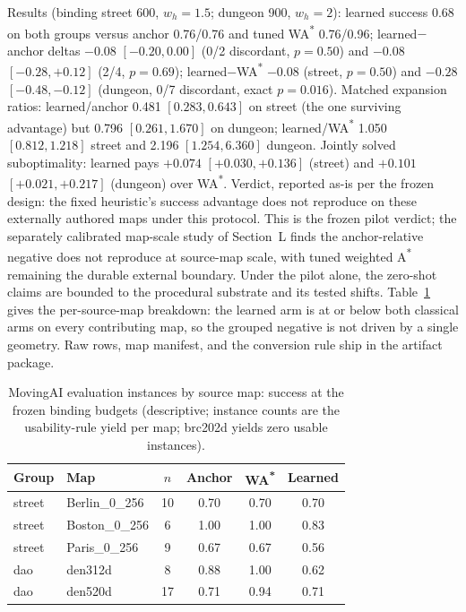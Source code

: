 \documentclass[letterpaper]{article} %
\begin{document}
Results (binding street 600, $w_h{=}1.5$; dungeon 900, $w_h{=}2$): learned success 0.68 on both groups versus anchor 0.76/0.76 and tuned WA\textsuperscript{*} 0.76/0.96; learned$-$anchor deltas $-0.08$ $[-0.20, 0.00]$ (0/2 discordant, $p{=}0.50$) and $-0.08$ $[-0.28, +0.12]$ (2/4, $p{=}0.69$); learned$-$WA\textsuperscript{*} $-0.08$ (street, $p{=}0.50$) and $-0.28$ $[-0.48,-0.12]$ (dungeon, 0/7 discordant, exact $p{=}0.016$). Matched expansion ratios: learned/anchor 0.481 $[0.283, 0.643]$ on street (the one surviving advantage) but 0.796 $[0.261, 1.670]$ on dungeon; learned/WA\textsuperscript{*} 1.050 $[0.812, 1.218]$ street and 2.196 $[1.254, 6.360]$ dungeon. Jointly solved suboptimality: learned pays $+0.074$ $[+0.030, +0.136]$ (street) and $+0.101$ $[+0.021, +0.217]$ (dungeon) over WA\textsuperscript{*}. Verdict, reported as-is per the frozen design: the fixed heuristic's success advantage does not reproduce on these externally authored maps under this protocol. This is the frozen pilot verdict; the separately calibrated map-scale study of Section~L finds the anchor-relative negative does not reproduce at source-map scale, with tuned weighted A\textsuperscript{*} remaining the durable external boundary. Under the pilot alone, the zero-shot claims are bounded to the procedural substrate and its tested shifts. Table~\ref{tab:maimaps} gives the per-source-map breakdown: the learned arm is at or below both classical arms on every contributing map, so the grouped negative is not driven by a single geometry. Raw rows, map manifest, and the conversion rule ship in the artifact package.

\begin{table}[t]
\centering
\small
\setlength{\tabcolsep}{3pt}
\begin{tabular}{@{}llcccc@{}}
\toprule
Group & Map & $n$ & Anchor & WA\textsuperscript{*} & Learned \\
\midrule
street & Berlin\_0\_256 & 10 & 0.70 & 0.70 & 0.70 \\
street & Boston\_0\_256 & 6 & 1.00 & 1.00 & 0.83 \\
street & Paris\_0\_256 & 9 & 0.67 & 0.67 & 0.56 \\
dao & den312d & 8 & 0.88 & 1.00 & 0.62 \\
dao & den520d & 17 & 0.71 & 0.94 & 0.71 \\
\bottomrule
\end{tabular}
\caption{MovingAI evaluation instances by source map: success at the frozen binding budgets (descriptive; instance counts are the usability-rule yield per map; brc202d yields zero usable instances).}
\label{tab:maimaps}
\end{table}
\end{document}
